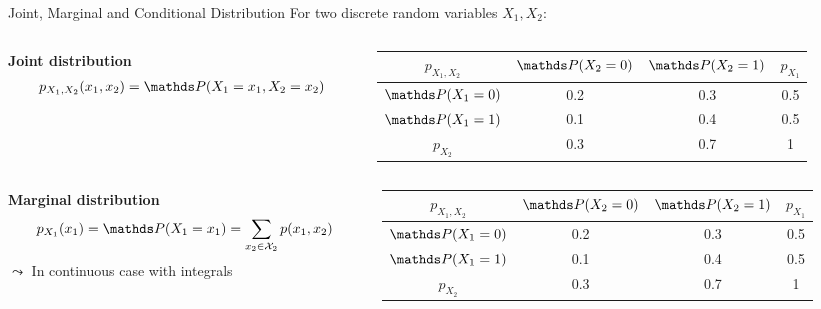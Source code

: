 \documentclass[10pt,compress,t,notes=noshow, xcolor=table]{beamer}
\begin{document}
\begin{frame}{Joint, Marginal and Conditional Distribution}
    For two discrete random variables $X_1, X_2$:
    
    \begin{columns}[c, totalwidth=\textwidth]
    \begin{column}{0.5\textwidth}
    \textbf{Joint distribution}
        \begin{align*}
            p_{X_1, X_2}(x_1,x_2) = \P(X_1 = x_1, X_2 = x_2) %
        \end{align*}
    \end{column}
    \begin{column}{0.5\textwidth}
    \begin{table}
    \scriptsize
        \begin{tabular}{|c|c|c|c|}
            \hline 
            $p_{X_1, X_2}$ & $\P(X_2 = 0)$ & $\P(X_2 = 1)$ & $p_{X_1}$ \\
            \hline
            $\P(X_1 = 0)$ & \cellcolor{gray}0.2 & \cellcolor{gray}0.3 & 0.5  \\
            \hline
            $\P(X_1 = 1)$ & \cellcolor{gray}0.1 & \cellcolor{gray}0.4 & 0.5  \\
            \hline
            $p_{X_2}$ & 0.3 & 0.7 & 1  \\
            \hline
        \end{tabular} 
    \end{table}
    \end{column}
    \end{columns} 

\medskip\pause
    
\begin{columns}[c, totalwidth=\textwidth]
    \begin{column}{0.5\textwidth}
    \textbf{Marginal distribution}
        \begin{align*}
            p_{X_1}(x_1) = \P(X_1 = x_1) = \sum_{x_2\in \mathcal{X}_2} p(x_1,x_2)
        \end{align*}    
        $\leadsto$ In continuous case with integrals
    \end{column}
    \begin{column}{0.5\textwidth}
    \begin{table}
    \scriptsize
        \begin{tabular}{|c|c|c|c|}
            \hline 
            $p_{X_1, X_2}$ & $\P(X_2 = 0)$ & $\P(X_2 = 1)$ & $p_{X_1}$ \\
            \hline
            $\P(X_1 = 0)$ & 0.2 & 0.3 & \cellcolor{gray}0.5  \\
            \hline
            $\P(X_1 = 1)$ & 0.1 & 0.4 & \cellcolor{gray}0.5  \\
            \hline
            $p_{X_2}$ & 0.3 & 0.7 & 1  \\
            \hline
        \end{tabular}
    \end{table}
    \end{column}
    \end{columns} 


\end{frame}
\end{document}
